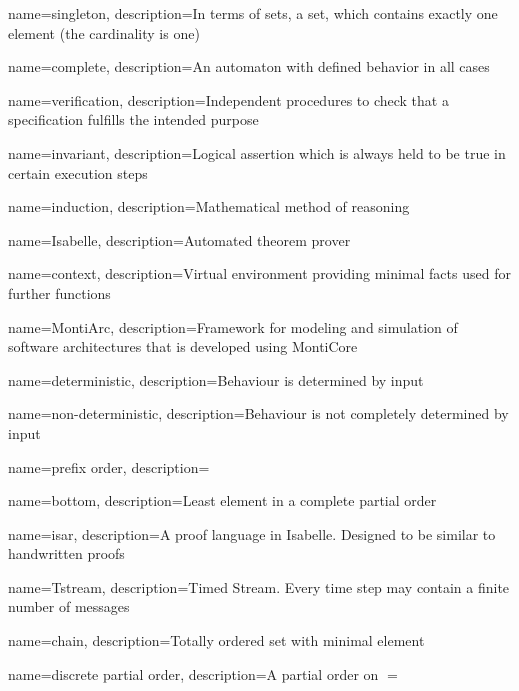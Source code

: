 {
    name={singleton},
    description={In terms of sets, a set, which contains exactly one element (the cardinality is one)}
}

{
    name={complete},
    description={An automaton with defined behavior in all cases}
}

{
    name={verification},
    description={Independent procedures to check that a specification fulfills the intended purpose}
}

{
    name={invariant},
    description={Logical assertion which is always held to be true in certain execution steps}
}

{
    name={induction},
    description={Mathematical method of reasoning}
}

{
    name={Isabelle},
    description={Automated theorem prover}
}

{
    name={context},
    description={Virtual environment providing minimal facts used for further functions}
}

{
    name=MontiArc,
    description={Framework for modeling and simulation of software architectures that is developed using MontiCore}
}

{
    name=deterministic,
    description={Behaviour is determined by input}
}

{
    name=non-deterministic,
    description={Behaviour is not completely determined by input}
}

{
    name=prefix order,
    description={}
}

{
    name=bottom,
    description={Least element in a complete partial order}
}

{
    name=isar,
    description={A proof language in Isabelle. Designed to be similar to handwritten proofs}
}

{
    name=Tstream,
    description={Timed Stream. Every time step may contain a finite number of messages}
}

{
    name=chain,
    description={Totally ordered set with minimal element}
}

{
    name=discrete partial order,
    description={A partial order on $=$}
}

